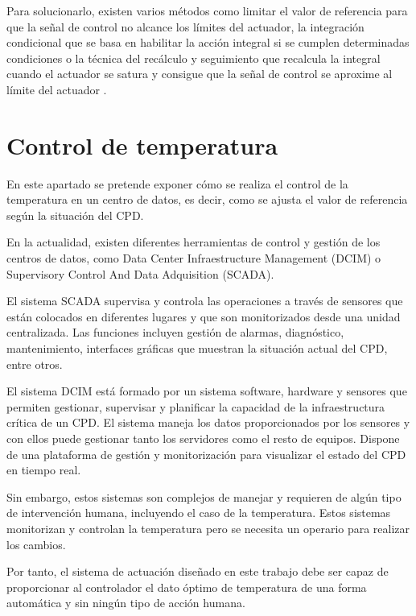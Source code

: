 	Para solucionarlo, existen varios métodos como limitar el valor de referencia para que la señal de control no alcance los límites del actuador, la integración condicional que se basa en habilitar la acción integral si se cumplen determinadas condiciones o la técnica del recálculo y seguimiento que recalcula la integral cuando el actuador se satura y consigue que la señal de control se aproxime al límite del actuador \cite{control3}. 

\section{Control de temperatura}

	En este apartado se pretende exponer cómo se realiza el control de la temperatura en un centro de datos, es decir, como se ajusta el valor de referencia según la situación del CPD.

	En la actualidad, existen diferentes herramientas de control y gestión de los centros de datos, como Data Center Infraestructure Management (DCIM) o Supervisory Control And Data Adquisition (SCADA). 

	El sistema SCADA supervisa y controla las operaciones a través de sensores que están colocados en diferentes lugares y que son monitorizados desde una unidad centralizada. Las funciones incluyen gestión de alarmas, diagnóstico, mantenimiento, interfaces gráficas que muestran la situación actual del CPD, entre otros. 

	El sistema DCIM está formado por un sistema software, hardware y sensores que permiten gestionar, supervisar y planificar la capacidad de la infraestructura crítica de un CPD. El sistema maneja los datos proporcionados por los sensores y con ellos puede gestionar tanto los servidores como el resto de equipos. Dispone de una plataforma de gestión y monitorización para visualizar el estado del CPD en tiempo real.

	Sin embargo, estos sistemas son complejos de manejar y requieren de algún tipo de intervención humana, incluyendo el caso de  la temperatura. Estos sistemas monitorizan y controlan la temperatura pero se necesita un operario para realizar los cambios.

	Por tanto, el sistema de actuación diseñado en este trabajo debe ser capaz de proporcionar al controlador el dato óptimo de temperatura de una forma automática y sin ningún tipo de acción humana.
